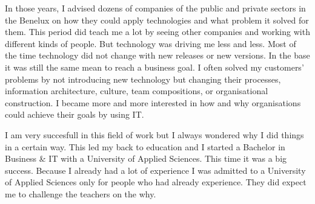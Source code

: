 In those years, I advised dozens of companies of the public and private sectors in the Benelux on how they could apply technologies and what problem it solved for them. This period did teach me a lot by seeing other companies and working with different kinds of people. But technology was driving me less and less. Most of the time technology did not change with new releases or new versions. In the base it was still the same mean to reach a business goal. I often solved my customers' problems by not introducing new technology but changing their processes, information architecture, culture, team compositions, or organisational construction. I became more and more interested in how and why organisations could achieve their goals by using IT.

I am very succesfull in this field of work but I always wondered why I did things in a certain way. This led my back to education and I started a Bachelor in Business \& IT with a University of Applied Sciences. This time it was a big success. Because I already had a lot of experience I was admitted to a University of Applied Sciences only for people who had already experience. They did expect me to challenge the teachers on the why.


